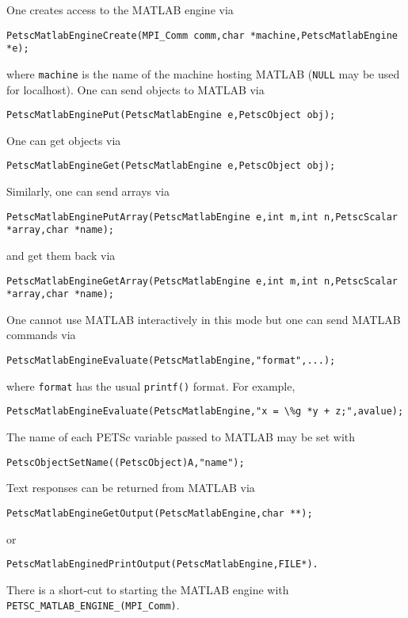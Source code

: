 One creates access to the MATLAB engine via
\begin{lstlisting}
PetscMatlabEngineCreate(MPI_Comm comm,char *machine,PetscMatlabEngine *e);
\end{lstlisting}
where \lstinline{machine} is the name of the machine hosting MATLAB (\lstinline{NULL} may be used for localhost).
One can send objects to MATLAB via
\begin{lstlisting}
PetscMatlabEnginePut(PetscMatlabEngine e,PetscObject obj);
\end{lstlisting}
One can get objects
via
\begin{lstlisting}
PetscMatlabEngineGet(PetscMatlabEngine e,PetscObject obj); 
\end{lstlisting}
Similarly, one can send arrays via
\begin{lstlisting}
PetscMatlabEnginePutArray(PetscMatlabEngine e,int m,int n,PetscScalar *array,char *name);
\end{lstlisting}
and get them back via
\begin{lstlisting}
PetscMatlabEngineGetArray(PetscMatlabEngine e,int m,int n,PetscScalar *array,char *name);
\end{lstlisting}
One cannot use MATLAB
interactively in this mode but one can send MATLAB commands via
\begin{lstlisting}
PetscMatlabEngineEvaluate(PetscMatlabEngine,"format",...);
\end{lstlisting}
where \lstinline{format} has the usual \lstinline{printf()} format.
For example,
\begin{lstlisting}
PetscMatlabEngineEvaluate(PetscMatlabEngine,"x = \%g *y + z;",avalue);
\end{lstlisting}
The name of each PETSc variable passed to MATLAB may be set with
\begin{lstlisting}
PetscObjectSetName((PetscObject)A,"name");
\end{lstlisting}

Text responses can be returned from MATLAB via
\begin{lstlisting}
PetscMatlabEngineGetOutput(PetscMatlabEngine,char **);
\end{lstlisting}
or
\begin{lstlisting}
PetscMatlabEnginedPrintOutput(PetscMatlabEngine,FILE*).
\end{lstlisting}
There is a short-cut to starting the MATLAB engine
with \lstinline{PETSC_MATLAB_ENGINE_(MPI_Comm)}.

\cleardoublepage
